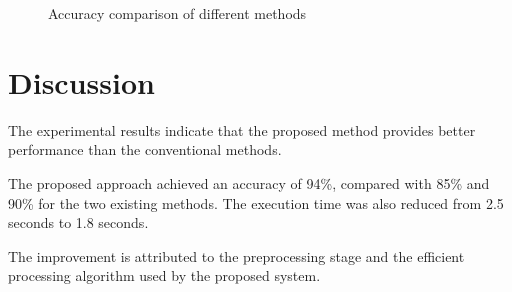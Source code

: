 \documentclass[conference]{IEEEtran}
\begin{document}
\begin{figure}[H]

\centering


\caption{Accuracy comparison of different methods}

\label{fig:accuracy}

\end{figure}


\section{Discussion}

The experimental results indicate that the proposed method
provides better performance than the conventional methods.

The proposed approach achieved an accuracy of 94\%, compared
with 85\% and 90\% for the two existing methods. The execution
time was also reduced from 2.5 seconds to 1.8 seconds.

The improvement is attributed to the preprocessing stage and
the efficient processing algorithm used by the proposed
system.

\end{document}
